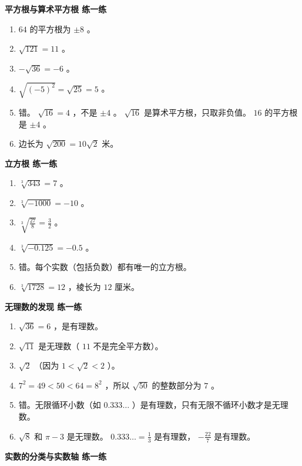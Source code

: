 \begin{answer}


\textbf{平方根与算术平方根 练一练}

\begin{enumerate}
  \item $64$ 的平方根为 $\pm 8$ 。
  \item $\sqrt{121} = 11$ 。
  \item $-\sqrt{36} = -6$ 。
  \item $\sqrt{(-5)^2} = \sqrt{25} = 5$ 。
  \item 错。 $\sqrt{16} = 4$ ，不是 $\pm 4$ 。 $\sqrt{16}$ 是算术平方根，只取非负值。 $16$ 的平方根是 $\pm 4$ 。
  \item 边长为 $\sqrt{200} = 10\sqrt{2}$ 米。
\end{enumerate}


\textbf{立方根 练一练}

\begin{enumerate}
  \item $\sqrt[3]{343} = 7$ 。
  \item $\sqrt[3]{-1000} = -10$ 。
  \item $\sqrt[3]{\frac{27}{8}} = \frac{3}{2}$ 。
  \item $\sqrt[3]{-0.125} = -0.5$ 。
  \item 错。每个实数（包括负数）都有唯一的立方根。
  \item $\sqrt[3]{1728} = 12$ ，棱长为 $12$ 厘米。
\end{enumerate}


\textbf{无理数的发现 练一练}

\begin{enumerate}
  \item $\sqrt{36} = 6$ ，是有理数。
  \item $\sqrt{11}$ 是无理数（ $11$ 不是完全平方数）。
  \item $\sqrt{2}$ （因为 $1 < \sqrt{2} < 2$ ）。
  \item $7^2 = 49 < 50 < 64 = 8^2$ ，所以 $\sqrt{50}$ 的整数部分为 $7$ 。
  \item 错。无限循环小数（如 $0.333\ldots$ ）是有理数，只有无限不循环小数才是无理数。
  \item $\sqrt{8}$ 和 $\pi - 3$ 是无理数。 $0.333\ldots = \frac{1}{3}$ 是有理数， $-\frac{22}{7}$ 是有理数。
\end{enumerate}


\textbf{实数的分类与实数轴 练一练}


\end{answer}
